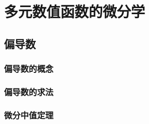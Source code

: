 

\chapter{多元数值函数的微分学}\label{ch:16}

\section{偏导数}
\subsection{偏导数的概念}
\subsection{偏导数的求法}
\subsection{微分中值定理}
